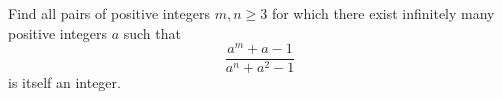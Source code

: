 Find all pairs of positive integers $m,n\geq3$ for which there exist infinitely many positive integers $a$ such that \[ \frac{a^m+a-1}{a^n+a^2-1}  \] is itself an integer.
